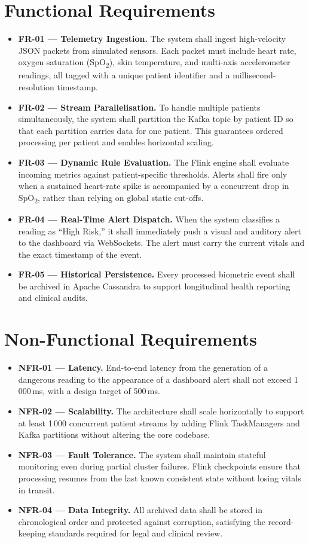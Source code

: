 \documentclass[12pt, a4paper, oneside]{report}
\begin{document}
\section{Functional Requirements}
\begin{itemize}
    \item \textbf{FR-01 --- Telemetry Ingestion.} The system shall ingest high-velocity JSON packets from simulated sensors. Each packet must include heart rate, oxygen saturation (SpO\textsubscript{2}), skin temperature, and multi-axis accelerometer readings, all tagged with a unique patient identifier and a millisecond-resolution timestamp.
    \item \textbf{FR-02 --- Stream Parallelisation.} To handle multiple patients simultaneously, the system shall partition the Kafka topic by patient ID so that each partition carries data for one patient. This guarantees ordered processing per patient and enables horizontal scaling.
    \item \textbf{FR-03 --- Dynamic Rule Evaluation.} The Flink engine shall evaluate incoming metrics against patient-specific thresholds. Alerts shall fire only when a sustained heart-rate spike is accompanied by a concurrent drop in SpO\textsubscript{2}, rather than relying on global static cut-offs.
    \item \textbf{FR-04 --- Real-Time Alert Dispatch.} When the system classifies a reading as ``High Risk,'' it shall immediately push a visual and auditory alert to the dashboard via WebSockets. The alert must carry the current vitals and the exact timestamp of the event.
    \item \textbf{FR-05 --- Historical Persistence.} Every processed biometric event shall be archived in Apache Cassandra to support longitudinal health reporting and clinical audits.
\end{itemize}

\section{Non-Functional Requirements}
\begin{itemize}
    \item \textbf{NFR-01 --- Latency.} End-to-end latency from the generation of a dangerous reading to the appearance of a dashboard alert shall not exceed 1\,000\,ms, with a design target of 500\,ms.
    \item \textbf{NFR-02 --- Scalability.} The architecture shall scale horizontally to support at least 1\,000 concurrent patient streams by adding Flink TaskManagers and Kafka partitions without altering the core codebase.
    \item \textbf{NFR-03 --- Fault Tolerance.} The system shall maintain stateful monitoring even during partial cluster failures. Flink checkpoints ensure that processing resumes from the last known consistent state without losing vitals in transit.
    \item \textbf{NFR-04 --- Data Integrity.} All archived data shall be stored in chronological order and protected against corruption, satisfying the record-keeping standards required for legal and clinical review.
\end{itemize}
\end{document}
